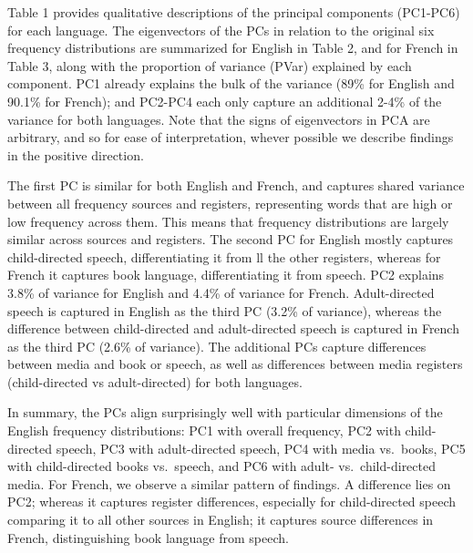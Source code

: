 \documentclass[10pt, letterpaper]{article}
\begin{document}
Table 1 provides qualitative descriptions of the principal components
(PC1-PC6) for each language. The eigenvectors of the PCs in relation to
the original six frequency distributions are summarized for English in
Table 2, and for French in Table 3, along with the proportion of
variance (PVar) explained by each component. PC1 already explains the
bulk of the variance (89\% for English and 90.1\% for French); and
PC2-PC4 each only capture an additional 2-4\% of the variance for both
languages. Note that the signs of eigenvectors in PCA are arbitrary, and
so for ease of interpretation, whever possible we describe findings in
the positive direction.

The first PC is similar for both English and French, and captures shared
variance between all frequency sources and registers, representing words
that are high or low frequency across them. This means that frequency
distributions are largely similar across sources and registers. The
second PC for English mostly captures child-directed speech,
differentiating it from ll the other registers, whereas for French it
captures book language, differentiating it from speech. PC2 explains
3.8\% of variance for English and 4.4\% of variance for French.
Adult-directed speech is captured in English as the third PC (3.2\% of
variance), whereas the difference between child-directed and
adult-directed speech is captured in French as the third PC (2.6\% of
variance). The additional PCs capture differences between media and book
or speech, as well as differences between media registers
(child-directed vs adult-directed) for both languages.

In summary, the PCs align surprisingly well with particular dimensions
of the English frequency distributions: PC1 with overall frequency, PC2
with child-directed speech, PC3 with adult-directed speech, PC4 with
media vs.~books, PC5 with child-directed books vs.~speech, and PC6 with
adult- vs.~child-directed media. For French, we observe a similar
pattern of findings. A difference lies on PC2; whereas it captures
register differences, especially for child-directed speech comparing it
to all other sources in English; it captures source differences in
French, distinguishing book language from speech.
\end{document}

